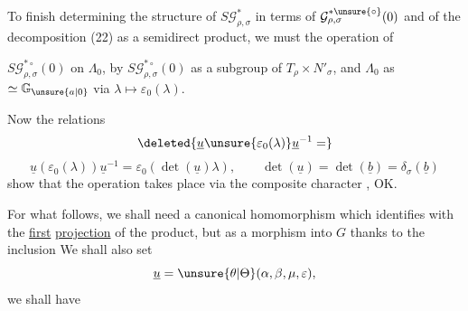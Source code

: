 To finish determining the structure
of $S\mathcal{G}_{\rho,\sigma}^{*}$ in terms of $\mathcal{G}_{\rho,\sigma}^{*\unsure{\circ}}(0)$ and
of the decomposition (22) as a semidirect product, we must  the operation of


$S\mathcal{G}_{\rho,\sigma}^{*\circ}(0)$ on $\Lambda_0$, by 
$S\mathcal{G}_{\rho,\sigma}^{*\circ}(0)$ as a subgroup of $T_\rho\times N'_\sigma$,
and $\Lambda_0$ as  $\simeq \mathbb{G}_{\unsure{a|0}}$ via $\lambda\mapsto\varepsilon_0(\lambda)$.

Now the relations
\[
\deleted{\underline{u}\unsure{\varepsilon_0(\lambda)}\underline{u}^{-1}=}
\]
\[
\underline{u}(\varepsilon_0(\lambda))\underline{u}^{-1}
 =\varepsilon_0(\det(\underline{u})\lambda),\qquad
\det(\underline{u})=\det(\underline{b})=\delta_\sigma(\underline{b})
\]
show that the operation takes place via
the composite character
, OK.

For what follows, we shall need
a canonical homomorphism
which identifies with the \uline{first} \uline{projection}
of the product, but  as
a morphism into $G$ thanks to the inclusion
We shall also  set
\unsure{(}
\[
\underline{u}=\unsure{\theta|\Theta}(\alpha,\beta,\mu,\varepsilon),
\]
  we shall have

